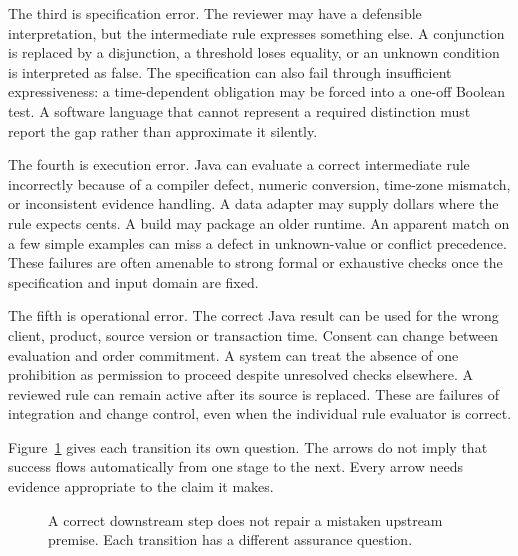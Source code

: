 The third is specification error. The reviewer may have a defensible
interpretation, but the intermediate rule expresses something else. A conjunction
is replaced by a disjunction, a threshold loses equality, or an unknown condition
is interpreted as false. The specification can also fail through insufficient
expressiveness: a time-dependent obligation may be forced into a one-off Boolean
test. A software language that cannot represent a required distinction must
report the gap rather than approximate it silently.

The fourth is execution error. Java can evaluate a correct intermediate rule
incorrectly because of a compiler defect, numeric conversion, time-zone mismatch,
or inconsistent evidence handling. A data adapter may supply dollars where the
rule expects cents. A build may package an older runtime. An apparent match on a
few simple examples can miss a defect in unknown-value or conflict precedence.
These failures are often amenable to strong formal or exhaustive checks once
the specification and input domain are fixed.

The fifth is operational error. The correct Java result can be used for the
wrong client, product, source version or transaction time. Consent can change
between evaluation and order commitment. A system can treat the absence of one
prohibition as permission to proceed despite unresolved checks elsewhere. A
reviewed rule can remain active after its source is replaced. These are failures
of integration and change control, even when the individual rule evaluator is
correct.

Figure~\ref{fig:assurance-chain} gives each transition its own question. The
arrows do not imply that success flows automatically from one stage to the next. Every
arrow needs evidence appropriate to the claim it makes.

\begin{figure}[htbp]
\centering
{}
\caption{A correct downstream step does not repair a mistaken upstream premise.
Each transition has a different assurance question.}
\label{fig:assurance-chain}
\end{figure}

